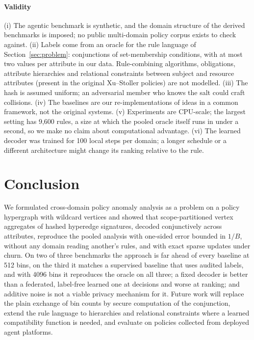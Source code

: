 \documentclass[preprint,12pt]{elsarticle}
\theoremstyle{definition}
\begin{document}
\paragraph{Validity} (i) The agentic benchmark is synthetic, and the domain structure of the derived benchmarks is imposed; no public multi-domain policy corpus exists to check against. (ii) Labels come from an oracle for the rule language of Section~\ref{sec:problem}: conjunctions of set-membership conditions, with at most two values per attribute in our data. Rule-combining algorithms, obligations, attribute hierarchies and relational constraints between subject and resource attributes (present in the original Xu--Stoller policies) are not modelled. (iii) The hash is assumed uniform; an adversarial member who knows the salt could craft collisions. (iv) The baselines are our re-implementations of ideas in a common framework, not the original systems. (v) Experiments are CPU-scale; the largest setting has 9{,}600 rules, a size at which the pooled oracle itself runs in under a second, so we make no claim about computational advantage. (vi) The learned decoder was trained for 100 local steps per domain; a longer schedule or a different architecture might change its ranking relative to the rule.

\section{Conclusion}
\label{sec:conclusion}
We formulated cross-domain policy anomaly analysis as a problem on a policy hypergraph with wildcard vertices and showed that scope-partitioned vertex aggregates of hashed hyperedge signatures, decoded conjunctively across attributes, reproduce the pooled analysis with one-sided error bounded in $1/B$, without any domain reading another's rules, and with exact sparse updates under churn. On two of three benchmarks the approach is far ahead of every baseline at 512 bins, on the third it matches a supervised baseline that uses audited labels, and with 4096 bins it reproduces the oracle on all three; a fixed decoder is better than a federated, label-free learned one at decisions and worse at ranking; and additive noise is not a viable privacy mechanism for it. Future work will replace the plain exchange of bin counts by secure computation of the conjunction, extend the rule language to hierarchies and relational constraints where a learned compatibility function is needed, and evaluate on policies collected from deployed agent platforms.
\end{document}
